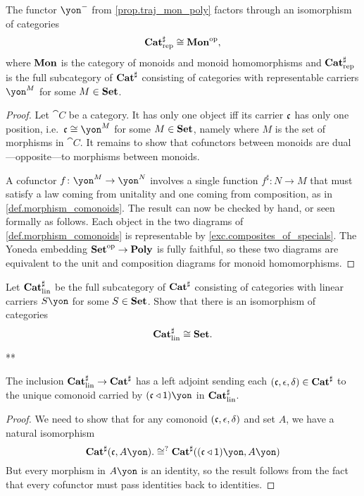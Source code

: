 \documentclass[Book-Poly]{subfiles}
\begin{document}
\begin{proposition}
The functor $\yon^-$ from \cref{prop.traj_mon_poly} factors through an isomorphism of categories
\[
    \mathbf{Cat}^\sharp_{\text{rep}}\cong\mathbf{Mon}^{\textnormal{op}},
\]
where $\mathbf{Mon}$ is the category of monoids and monoid homomorphisms and  $\mathbf{Cat}^\sharp_{\text{rep}}$ is the full subcategory of $\mathbf{Cat}^\sharp$ consisting of categories with representable carriers $\yon^M$ for some $M\in\mathbf{Set}$.
\end{proposition}
\begin{proof}
Let $\cat{C}$ be a category. It has only one object iff its carrier $\mathfrak{c}$ has only one position, i.e.\ $\car{c}\cong\yon^M$ for some $M\in\mathbf{Set}$, namely where $M$ is the set of morphisms in $\cat{C}$. It remains to show that cofunctors between monoids are dual---opposite---to morphisms between monoids.

A cofunctor $f\colon\yon^M\to\yon^N$ involves a single function $f^\sharp\colon N\to M$ that must satisfy a law coming from unitality and one coming from composition, as in \cref{def.morphism_comonoids}. The result can now be checked by hand, or seen formally as follows. Each object in the two diagrams of \eqref{def.morphism_comonoids} is representable by \cref{exc.composites_of_specials}. The Yoneda embedding $\mathbf{Set}^{\textnormal{op}}\to\mathbf{Poly}$ is fully faithful, so these two diagrams are equivalent to the unit and composition diagrams for monoid homomorphisms.
\end{proof}

\begin{exercise}\label{exc.lin_comon_set}
Let $\mathbf{Cat}^\sharp_{\text{lin}}$ be the full subcategory of $\mathbf{Cat}^\sharp$ consisting of categories with linear carriers $S\yon$ for some $S\in\mathbf{Set}$.
Show that there is an isomorphism of categories
\[
\mathbf{Cat}^\sharp_{\text{lin}}\cong\mathbf{Set}.
\qedhere
\]
\begin{solution}
**
\end{solution}
\end{exercise}

\begin{proposition}
The inclusion $\mathbf{Cat}^\sharp_{\text{lin}}\to\mathbf{Cat}^\sharp$ has a left adjoint sending each $(\mathfrak{c},\epsilon,\delta)\in\mathbf{Cat}^\sharp$ to the unique comonoid carried by $(\car{c}\tri\1)\yon$ in $\mathbf{Cat}^\sharp_{\text{lin}}$.
\end{proposition}
\begin{proof}
We need to show that for any comonoid $(\mathfrak{c},\epsilon,\delta)$ and set $A$, we have a natural isomorphism
\[
  \smcat^\sharp(\car{c},A\yon).
  \cong^?
  \smcat^\sharp((\car{c}\tri\1)\yon,A\yon)
\]
But every morphism in $A\yon$ is an identity, so the result follows from the fact that every cofunctor must pass identities back to identities. 
\end{proof}
\end{document}
